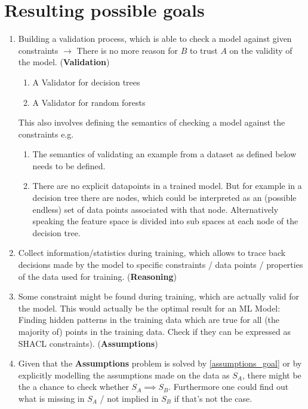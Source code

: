 \documentclass[../../thesis]{subfiles}
\begin{document}
\section{Resulting possible goals}
\begin{enumerate}
    \item Building a validation process, which is able to check a model against given constraints $\rightarrow$ There is no more reason for $B$ to trust $A$ on the validity of the model. (\textbf{Validation}) \label{validation_process_goal}
    \begin{enumerate}
        \item A Validator for decision trees
        \item A Validator for random forests
    \end{enumerate}
    This also involves defining the semantics of checking a model against the constraints e.g. 
    \begin{enumerate}
        \item The semantics of validating an example from a dataset as defined below needs to be defined. 
        \item There are no explicit datapoints in a trained model. But for example in a decision tree there are nodes, which could be interpreted as an (possible endless) set of  data points associated with that node. Alternatively speaking the feature space is divided into sub spaces at each node of the decision tree.
    \end{enumerate}
    \item Collect information/statistics during training, which allows to trace back decisions made by the model to specific constraints / data points / properties of the data used for training. (\textbf{Reasoning}) \label{reasoning_goal}
    \item Some constraint might be found during training, which are actually valid for the model. This would actually be the optimal result for an ML Model: Finding hidden patterns in the training data which are true for all (the majority of) points in the training data. Check if they can be expressed as SHACL constraints). (\textbf{Assumptions}) \label{assumptions_goal}
    \item Given that the \textbf{Assumptions} problem is solved by \ref{assumptions_goal} or by explicitly modelling the assumptions made on the data as $S_A$, there might be the a chance to check whether $S_A \implies S_B$. Furthermore one could find out what is missing in $S_A$ / not implied in $S_B$ if that's not the case.
\end{enumerate}
\end{document}
